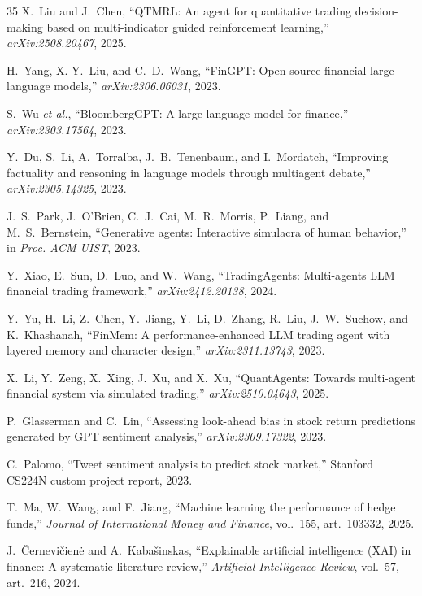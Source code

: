 \documentclass[10pt,twocolumn]{IEEEtran}
\begin{document}
\begin{thebibliography}{35}
X.~Liu and J.~Chen, ``QTMRL: An agent for quantitative trading decision-making
based on multi-indicator guided reinforcement learning,''
\emph{arXiv:2508.20467}, 2025.

H.~Yang, X.-Y.~Liu, and C.~D.~Wang, ``FinGPT: Open-source financial large
language models,'' \emph{arXiv:2306.06031}, 2023.

S.~Wu \emph{et al.}, ``BloombergGPT: A large language model for finance,''
\emph{arXiv:2303.17564}, 2023.

Y.~Du, S.~Li, A.~Torralba, J.~B.~Tenenbaum, and I.~Mordatch, ``Improving
factuality and reasoning in language models through multiagent debate,''
\emph{arXiv:2305.14325}, 2023.

J.~S.~Park, J.~O'Brien, C.~J.~Cai, M.~R.~Morris, P.~Liang, and
M.~S.~Bernstein, ``Generative agents: Interactive simulacra of human
behavior,'' in \emph{Proc. ACM UIST}, 2023.

Y.~Xiao, E.~Sun, D.~Luo, and W.~Wang, ``TradingAgents: Multi-agents LLM
financial trading framework,'' \emph{arXiv:2412.20138}, 2024.

Y.~Yu, H.~Li, Z.~Chen, Y.~Jiang, Y.~Li, D.~Zhang, R.~Liu, J.~W.~Suchow, and
K.~Khashanah, ``FinMem: A performance-enhanced LLM trading agent with layered
memory and character design,'' \emph{arXiv:2311.13743}, 2023.

X.~Li, Y.~Zeng, X.~Xing, J.~Xu, and X.~Xu, ``QuantAgents: Towards multi-agent
financial system via simulated trading,'' \emph{arXiv:2510.04643}, 2025.

P.~Glasserman and C.~Lin, ``Assessing look-ahead bias in stock return
predictions generated by GPT sentiment analysis,'' \emph{arXiv:2309.17322},
2023.

C.~Palomo, ``Tweet sentiment analysis to predict stock market,'' Stanford
CS224N custom project report, 2023.

T.~Ma, W.~Wang, and F.~Jiang, ``Machine learning the performance of hedge
funds,'' \emph{Journal of International Money and Finance}, vol.~155,
art.~103332, 2025.

J.~\v{C}ernevi\v{c}ien\.{e} and A.~Kaba\v{s}inskas, ``Explainable artificial
intelligence (XAI) in finance: A systematic literature review,''
\emph{Artificial Intelligence Review}, vol.~57, art.~216, 2024.


\end{thebibliography}
\end{document}

